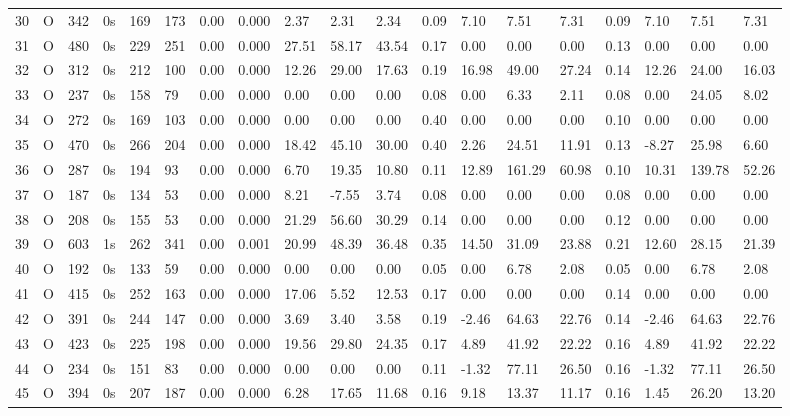 \begin{tabular}{rllllllrlllllllllll}
30 & O & 342 & 0s & 169 & 173 & 0.00 & 0.000 & 2.37 & 2.31 & 2.34 & 0.09 & 7.10 & 7.51 & 7.31 & 0.09 & 7.10 & 7.51 & 7.31 \\
31 & O & 480 & 0s & 229 & 251 & 0.00 & 0.000 & 27.51 & 58.17 & 43.54 & 0.17 & 0.00 & 0.00 & 0.00 & 0.13 & 0.00 & 0.00 & 0.00 \\
32 & O & 312 & 0s & 212 & 100 & 0.00 & 0.000 & 12.26 & 29.00 & 17.63 & 0.19 & 16.98 & 49.00 & 27.24 & 0.14 & 12.26 & 24.00 & 16.03 \\
33 & O & 237 & 0s & 158 & 79 & 0.00 & 0.000 & 0.00 & 0.00 & 0.00 & 0.08 & 0.00 & 6.33 & 2.11 & 0.08 & 0.00 & 24.05 & 8.02 \\
34 & O & 272 & 0s & 169 & 103 & 0.00 & 0.000 & 0.00 & 0.00 & 0.00 & 0.40 & 0.00 & 0.00 & 0.00 & 0.10 & 0.00 & 0.00 & 0.00 \\
35 & O & 470 & 0s & 266 & 204 & 0.00 & 0.000 & 18.42 & 45.10 & 30.00 & 0.40 & 2.26 & 24.51 & 11.91 & 0.13 & -8.27 & 25.98 & 6.60 \\
36 & O & 287 & 0s & 194 & 93 & 0.00 & 0.000 & 6.70 & 19.35 & 10.80 & 0.11 & 12.89 & 161.29 & 60.98 & 0.10 & 10.31 & 139.78 & 52.26 \\
37 & O & 187 & 0s & 134 & 53 & 0.00 & 0.000 & 8.21 & -7.55 & 3.74 & 0.08 & 0.00 & 0.00 & 0.00 & 0.08 & 0.00 & 0.00 & 0.00 \\
38 & O & 208 & 0s & 155 & 53 & 0.00 & 0.000 & 21.29 & 56.60 & 30.29 & 0.14 & 0.00 & 0.00 & 0.00 & 0.12 & 0.00 & 0.00 & 0.00 \\
39 & O & 603 & 1s & 262 & 341 & 0.00 & 0.001 & 20.99 & 48.39 & 36.48 & 0.35 & 14.50 & 31.09 & 23.88 & 0.21 & 12.60 & 28.15 & 21.39 \\
40 & O & 192 & 0s & 133 & 59 & 0.00 & 0.000 & 0.00 & 0.00 & 0.00 & 0.05 & 0.00 & 6.78 & 2.08 & 0.05 & 0.00 & 6.78 & 2.08 \\
41 & O & 415 & 0s & 252 & 163 & 0.00 & 0.000 & 17.06 & 5.52 & 12.53 & 0.17 & 0.00 & 0.00 & 0.00 & 0.14 & 0.00 & 0.00 & 0.00 \\
42 & O & 391 & 0s & 244 & 147 & 0.00 & 0.000 & 3.69 & 3.40 & 3.58 & 0.19 & -2.46 & 64.63 & 22.76 & 0.14 & -2.46 & 64.63 & 22.76 \\
43 & O & 423 & 0s & 225 & 198 & 0.00 & 0.000 & 19.56 & 29.80 & 24.35 & 0.17 & 4.89 & 41.92 & 22.22 & 0.16 & 4.89 & 41.92 & 22.22 \\
44 & O & 234 & 0s & 151 & 83 & 0.00 & 0.000 & 0.00 & 0.00 & 0.00 & 0.11 & -1.32 & 77.11 & 26.50 & 0.16 & -1.32 & 77.11 & 26.50 \\
45 & O & 394 & 0s & 207 & 187 & 0.00 & 0.000 & 6.28 & 17.65 & 11.68 & 0.16 & 9.18 & 13.37 & 11.17 & 0.16 & 1.45 & 26.20 & 13.20 \\

\end{tabular}
